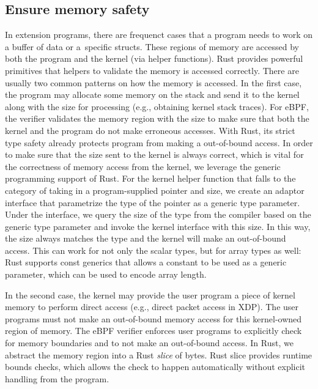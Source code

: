 \subsection{Ensure memory safety}
In extension programs, there are
    frequenct cases that a program needs to work on a buffer of data or a\
    specific structs.
These regions of memory are accessed by both the program and the kernel (via
    helper functions).
Rust provides powerful primitives that helpers to validate the memory is
    accessed correctly.
There are usually two common patterns on how the memory is accessed.
In the first case, the program may allocate some memory on the stack and send
    it to the kernel along with the size for processing (e.g., obtaining kernel
    stack traces).
For eBPF, the verifier validates the memory region with the size to make sure
    that both the kernel and the program do not make erroneous accesses.
With Rust, its strict type safety already protects program from making a
    out-of-bound access.
In order to make sure that the size sent to the kernel is always correct, which
    is vital for the correctness of memory access from the kernel, we leverage
    the generic programming support of Rust.
For the kernel helper function that falls to the category of taking in a
    program-supplied pointer and size, we create an adaptor interface that
    parametrize the type of the pointer as a generic type parameter.
Under the interface, we query the size of the type from the compiler based on
    the generic type parameter and invoke the kernel interface with this size.
In this way, the size always matches the type and the kernel will make an
    out-of-bound access.
This can work for not only the scalar types, but for array types as well: Rust
    supports const generics that allows a constant to be used as a generic
    parameter, which can be used to encode array length.

In the second case, the kernel may provide the user program a piece of kernel
    memory to perform direct access (e.g., direct packet access in XDP).
The user programs must not make an out-of-bound memory access for this
    kernel-owned region of memory.
The eBPF verifier enforces user programs to explicitly check for memory
    boundaries and to not make an out-of-bound access.
In Rust, we abstract the memory region into a Rust \textit{slice} of bytes.
Rust slice provides runtime bounds checks, which allows the check to happen
    automatically without explicit handling from the program.

